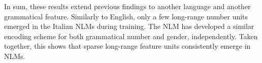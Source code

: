 \vspace{10pt}
In sum, these results extend previous findings to another language and another grammatical feature. Similarly to English, only a few long-range number units emerged in the Italian NLMs during training. The NLM has developed a similar encoding scheme for both grammatical number and gender, independently. Taken together, this shows that sparse long-range feature units consistently emerge in NLMs.





